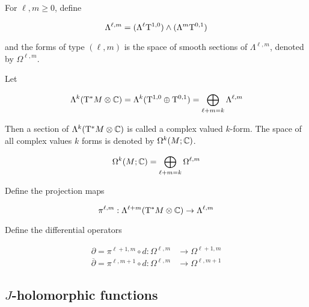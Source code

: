 \begin{definition}

    For \(\ell, m \ge 0\), define

    \[\Lambda^{\ell, m} = (\Lambda^\ell\mathrm{T}^{1, 0}) \wedge (\Lambda^m \mathrm{T}^{0, 1})\]

    and the forms of type \((\ell, m)\) is the space of smooth sections of \(\Lambda^{\ell, m}\), denoted by \(\Omega^{\ell, m}\).
\end{definition}

\begin{definition}

    Let

    \[\Lambda^k(\mathrm{T}^* M \otimes \mathbb{C}) = \Lambda^k(\mathrm{T}^{1, 0}\oplus \mathrm{T}^{0, 1}) = \bigoplus_{\ell + m = k}\Lambda^{\ell, m}\]

    Then a section of \(\Lambda^k(\mathrm{T}^*M \otimes \mathbb{C})\) is called a complex valued \(k\)-form. The space of all complex values \(k\) forms is denoted by \(\Omega^k(M; \mathbb{C})\).
\end{definition}

\begin{proposition}
    \[\Omega^k(M; \mathbb{C}) = \bigoplus_{\ell + m = k}\Omega^{\ell, m}\]
\end{proposition}

\begin{definition}

    Define the projection maps

    \[\pi^{\ell, m} : \Lambda^{\ell + m}(\mathrm{T}^* M \otimes \mathbb{C}) \to \Lambda^{\ell, m}\]
\end{definition}

\begin{definition}
     Define the differential operators

    \begin{align*}
        \partial = \pi^{\ell + 1, m} \circ d : \Omega^{\ell, m} &\to \Omega^{\ell + 1, m} \\
        \overline\partial = \pi^{\ell, m + 1} \circ d : \Omega^{\ell, m} &\to \Omega^{\ell, m + 1}
    \end{align*}
\end{definition}

\subsection{\(J\)-holomorphic functions}


